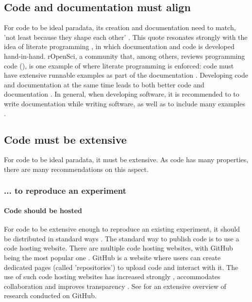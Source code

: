 \subsection{Code and documentation must align}

For code to be ideal paradata, 
its creation and documentation need to match, 
'not least because they shape each other' \cite{huvila2022improving}.
This quote resonates strongly with the idea of 
literate programming \cite{knuth1984literate},
in which documentation and code is developed hand-in-hand.
rOpenSci, a community that, among others, reviews programming
code (\cite{ram2013ropensci,ram2018community}), is 
one example of where literate programming is enforced:
code must have extensive runnable examples
as part of the documentation \cite{ropensci_2021_6619350}.
Developing code and documentation at the same time 
leads to both better code and documentation \cite{reenskaug1989environment}.
In general, when developing software, 
it is recommended to 
to write documentation while writing software,
as well as to include many examples \cite{lee2018ten}.


\subsection{Code must be extensive}

For code to be ideal paradata, it must be extensive.
As code has many properties, there are many recommendations on this aspect.

\subsubsection{... to reproduce an experiment}

\paragraph{Code should be hosted}

For code to be extensive enough to reproduce an existing experiment,
it should be distributed in standard ways \cite{peng2006reproducible}.
The standard way to publish code is to use a code hosting website.
There are multiple code hosting websites, 
with GitHub being the most popular one \cite{cosentino2017systematic}.
GitHub is a website where users can create dedicated pages (called 'repositories')
to upload code and interact with it.
The use of such code hosting websites
has increased strongly \cite{russell2018large},
accommodates collaboration \cite{perez2016ten}
and improves transparency \cite{gorgolewski2016practical}.
See \cite{cosentino2017systematic} for an extensive overview of
research conducted on GitHub.

